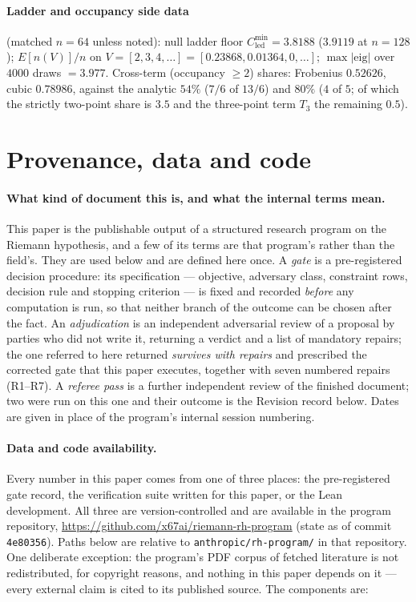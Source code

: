 \documentclass[11pt]{article}
\theoremstyle{plain}
\theoremstyle{definition}
\theoremstyle{remark}
\newcommand{\Cled}{C_{\mathrm{led}}}
\begin{document}
\paragraph{Ladder and occupancy side data}
(matched $n = 64$ unless noted): null ladder floor
$\Cled^{\min} = 3.8188$ ($3.9119$ at $n = 128$);
$E[n(V)]/n$ on $V = [2, 3, 4, \ldots] = [0.23868, 0.01364, 0, \ldots]$;
$\max |\mathrm{eig}|$ over $4000$ draws $= 3.977$. Cross-term (occupancy $\ge 2$)
shares: Frobenius $0.52626$, cubic $0.78986$, against the analytic $54\%$ ($7/6$
of $13/6$) and $80\%$ ($4$ of $5$; of which the strictly two-point share is $3.5$
and the three-point term $T_3$ the remaining $0.5$).

\section*{Provenance, data and code}

\paragraph{What kind of document this is, and what the internal terms mean.}
This paper is the publishable output of a structured research program on the
Riemann hypothesis, and a few of its terms are that program's rather than the
field's. They are used below and are defined here once. A \emph{gate} is a
pre-registered decision procedure: its specification --- objective, adversary
class, constraint rows, decision rule and stopping criterion --- is fixed and
recorded \emph{before} any computation is run, so that neither branch of the
outcome can be chosen after the fact. An \emph{adjudication} is an independent
adversarial review of a proposal by parties who did not write it, returning a
verdict and a list of mandatory repairs; the one referred to here returned
\emph{survives with repairs} and prescribed the corrected gate that this paper
executes, together with seven numbered repairs (R1--R7). A \emph{referee pass}
is a further independent review of the finished document; two were run on this
one and their outcome is the Revision record below. Dates are given in place of
the program's internal session numbering.

\paragraph{Data and code availability.}
Every number in this paper comes from one of three places: the pre-registered
gate record, the verification suite written for this paper, or the Lean
development. All three are version-controlled and are available in the program
repository, \url{https://github.com/x67ai/riemann-rh-program} (state as of commit
\texttt{4e80356}). Paths below are relative to \texttt{anthropic/rh-program/} in that
repository. One deliberate exception: the program's PDF corpus of fetched
literature is not redistributed, for copyright reasons, and nothing in this paper
depends on it --- every external claim is cited to its published source. The
components are:
\end{document}
